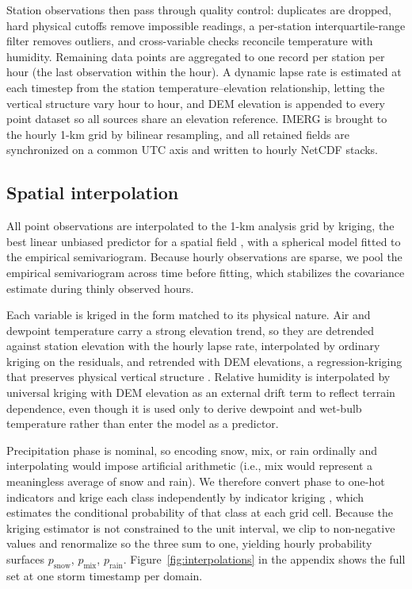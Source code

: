\documentclass[twocol]{ametsocV6.1} %
\begin{document}
Station observations then pass through quality control: duplicates are
dropped, hard physical cutoffs remove impossible readings, a per-station
interquartile-range filter removes outliers, and cross-variable checks reconcile
temperature with humidity. Remaining data points are aggregated to one record per
station per hour (the last observation within the hour). 
A dynamic lapse rate is estimated at each timestep from
the station temperature--elevation relationship, letting the vertical
structure vary hour to hour, and DEM elevation is appended to every point
dataset so all sources share an elevation reference. IMERG is brought to
the hourly 1-km grid by bilinear resampling, and all retained fields are
synchronized on a common UTC axis and written to hourly NetCDF stacks.

\subsection{Spatial interpolation}
\label{sec:interp}
All point observations are interpolated to the 1-km analysis grid by
kriging, the best linear unbiased predictor for a spatial field
\citep{cressie1993, goovaerts1997}, with a spherical model fitted to the
empirical semivariogram. Because hourly observations are sparse, we pool
the empirical semivariogram across time before fitting, which stabilizes
the covariance estimate during thinly observed hours.

Each variable is kriged in the form matched to its physical nature. Air and
dewpoint temperature carry a strong elevation trend, so they are
detrended against station elevation with the hourly lapse rate,
interpolated by ordinary kriging on the residuals, and retrended with DEM
elevations, a regression-kriging that preserves physical vertical
structure \citep{hengl2007}. Relative humidity is interpolated by
universal kriging with DEM elevation as an external drift term
\citep{wackernagel2003} to reflect terrain dependence, even though it 
is used only to derive dewpoint and wet-bulb temperature rather 
than enter the model as a predictor.

Precipitation phase is nominal, so encoding snow, mix, or rain ordinally and
interpolating would impose artificial arithmetic (i.e., mix would represent a 
meaningless average of snow and rain). We therefore convert phase to
one-hot indicators and krige each class independently by indicator
kriging \citep{journel1983}, which estimates the conditional probability
of that class at each grid cell. Because the kriging estimator is not
constrained to the unit interval, we clip to non-negative values and
renormalize so the three sum to one, yielding hourly probability
surfaces $p_{\mathrm{snow}}$, $p_{\mathrm{mix}}$, $p_{\mathrm{rain}}$.
Figure~\ref{fig:interpolations} in the appendix shows the full set at one
storm timestamp per domain.
\end{document}
